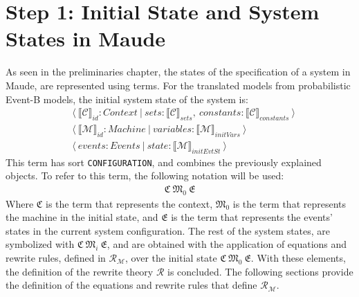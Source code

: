 \section{Step 1: Initial State and System States in Maude}
As seen in the preliminaries chapter, the states of the specification of a system in Maude, are represented using terms. For the translated models from probabilistic Event-B models, the initial system state of the system is:
\begin{align*}
        &\langle \ \llbracket \mathscr{C} \rrbracket_{id} : Context \ | \ sets: \llbracket \mathscr{C} \rrbracket_{sets} , \ constants: \llbracket \mathscr{C} \rrbracket_{constants} \ \rangle \\
        & \langle \ \llbracket \mathscr{M} \rrbracket_{id} : Machine \ | \ variables: \llbracket \mathscr{M} \rrbracket_{initVars} \ \rangle \\
        & \langle \ events : Events \ | \ state :  \llbracket \mathscr{M} \rrbracket_{initEvtSt}  \ \rangle
\end{align*}
This term has sort \texttt{CONFIGURATION}, and combines the previously explained objects. To refer to this term, the following notation will be used:
    \begin{align*}
        \mathfrak{C} \ \mathfrak{M}_{0}  \ \mathfrak{E}
    \end{align*}
Where $\mathfrak{C}$ is the term that represents the context, $\mathfrak{M}_{0}$ is the term that represents the machine in the initial state, and $\mathfrak{E}$ is the term that represents the events' states in the current system configuration. The rest of the system states, are symbolized with $\mathfrak{C} \ \mathfrak{M}_{i}  \ \mathfrak{E}$, and are obtained with the application of equations and rewrite rules, defined in $\mathscr{R}_\mathscr{M}$,  over the initial state $\mathfrak{C} \ \mathfrak{M}_{0}  \ \mathfrak{E}$. With these elements, the definition of the rewrite theory $\mathscr{R}$ is concluded. The following sections provide the definition of the equations and rewrite rules that define $\mathscr{R}_\mathscr{M}$.

